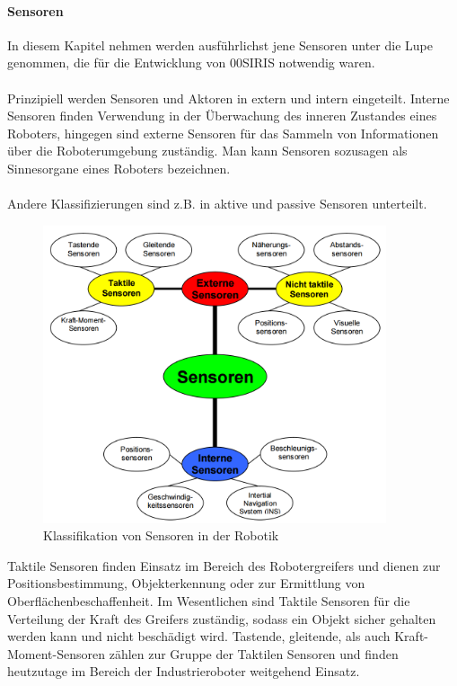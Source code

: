 \documentclass[11pt, a4paper]{article}
\begin{document}
\paragraph{Sensoren}
In diesem Kapitel nehmen werden ausf\"uhrlichst jene Sensoren unter die Lupe genommen, die f\"ur die Entwicklung von 00SIRIS notwendig waren. \\\\
Prinzipiell werden Sensoren und Aktoren in extern und intern eingeteilt. Interne Sensoren finden Verwendung in der \"Uberwachung des inneren Zustandes eines Roboters, hingegen sind externe Sensoren f\"ur das Sammeln von Informationen \"uber die Roboterumgebung zust\"andig. Man kann Sensoren sozusagen als Sinnesorgane eines Roboters bezeichnen.\\ \\
Andere Klassifizierungen sind z.B. in aktive und passive Sensoren unterteilt.
\newpage
\begin{figure}[h!]
		\centering
		\includegraphics[width=0.9\textwidth]{graphics/sensors/klassifizierung}
		\caption{Klassifikation von Sensoren in der Robotik {\cite{robot-sensors}}}
\end{figure}
\noindent Taktile Sensoren finden Einsatz im Bereich des Robotergreifers und dienen zur Positionsbestimmung, Objekterkennung oder zur Ermittlung von Oberfl\"achenbeschaffenheit. Im Wesentlichen sind Taktile Sensoren f\"ur die Verteilung der Kraft des Greifers zust\"andig, sodass ein Objekt sicher gehalten werden kann und nicht besch\"adigt wird. Tastende, gleitende, als auch Kraft-Moment-Sensoren z\"ahlen zur Gruppe der Taktilen Sensoren und finden heutzutage im Bereich der Industrieroboter weitgehend Einsatz. \\ \\
\end{document}
